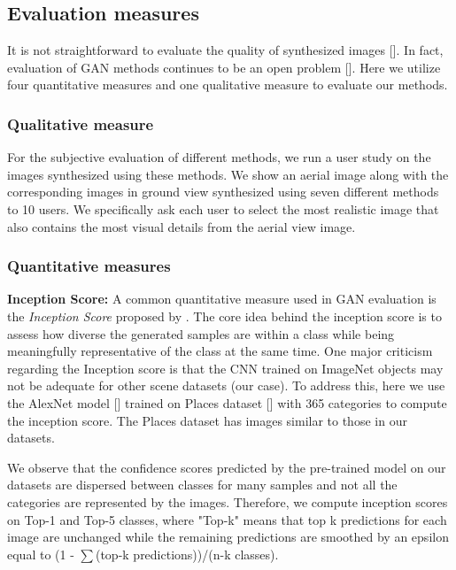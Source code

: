 \documentclass[times,twocolumn,final,authoryear]{elsarticle_modified}
\begin{document}
\vspace{-10pt}

\subsection{Evaluation measures} 
It is not straightforward to evaluate the quality of synthesized images [\cite{borji2018pros}]. In fact, evaluation of GAN methods continues to be an open problem [\cite{Theis2016a}]. Here we utilize four quantitative measures and one qualitative measure to evaluate our methods. 

\vspace{-5pt}

\subsubsection{Qualitative measure}
For the subjective evaluation of different methods, we run a user study on the images synthesized using these methods. We show an aerial image along with the corresponding images in ground view synthesized using seven different methods to 10 users. We specifically ask each user to select the most realistic image that also contains the most visual details from the aerial view image. 


\vspace{-5pt}

\subsubsection{Quantitative measures}
\noindent \textbf{Inception Score:}
A common quantitative measure used in GAN evaluation is the \textit{Inception Score}
proposed by \cite{DBLP:conf/nips/SalimansGZCRCC16}. 
The core idea behind the inception score is to assess how diverse the generated samples are within a class while being meaningfully representative of the class at the same time. One major criticism regarding the Inception score is that the CNN trained on ImageNet objects may not be adequate for other scene datasets (our case). To address this, here we use the AlexNet model [\cite{DBLP:journals/cacm/KrizhevskySH17}] trained on Places dataset [\cite{zhou2017places}] with 365 categories to compute the inception score. The Places dataset has images similar to those in our datasets. 

We observe that the confidence scores predicted by the pre-trained model on our datasets are dispersed between classes for many samples and not all the categories are represented by the images. Therefore, we compute inception scores on Top-1 and Top-5 classes, where "Top-k" means that top k predictions for each image are unchanged while the remaining predictions are smoothed by an epsilon equal to (1 - $\sum$(top-k predictions))/(n-k classes). 
\end{document}
